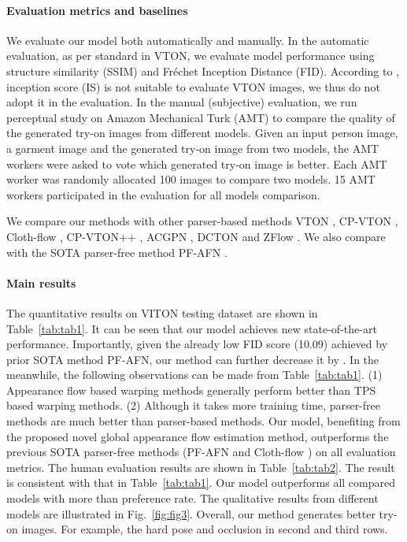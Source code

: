 \documentclass[10pt,twocolumn,letterpaper]{article}
\begin{document}
\paragraph{Evaluation metrics and baselines} We evaluate our model both automatically and manually. In the automatic evaluation, as per standard in VTON, we evaluate model performance using structure similarity (SSIM) \cite{wang2004image} and Fr\'{e}chet Inception Distance (FID)\cite{heusel2017gans}. According to \cite{rosca2017variational,ge2021parser}, inception score (IS) \cite{salimans2016improved} is not suitable to evaluate VTON images, we thus do not adopt it in the evaluation. In the manual (subjective) evaluation, we run perceptual study on
Amazon Mechanical Turk (AMT) to compare the quality
of the generated try-on images from different models. Given an  input person image, a garment image and the generated try-on image from two models, the AMT workers were asked to vote which generated try-on image is better. Each AMT worker was randomly allocated 100 images to compare two models. 15 AMT workers participated in the evaluation for all models comparison.

We compare our methods with other parser-based methods VTON \cite{han2018viton}, CP-VTON \cite{wang2018toward}, Cloth-flow \cite{han2019clothflow}, CP-VTON++ \cite{minar2020cp}, ACGPN \cite{yang2020towards}, DCTON \cite{ge2021disentangled} and ZFlow \cite{chopra2021zflow}. We also compare with the SOTA parser-free method PF-AFN \cite{ge2021parser}. 
\vspace{-0.4cm}
\paragraph{Main results} The quantitative results on VITON testing dataset are  shown in Table~\ref{tab:tab1}. It can be seen that our model achieves new state-of-the-art performance. Importantly, given the already low FID score (10.09) achieved by prior SOTA method PF-AFN,  our method can further decrease it by . In the meanwhile, the following observations can be made from  Table~\ref{tab:tab1}. (1) Appearance flow based warping methods generally perform better than TPS based warping methods. (2) Although it takes more training time, parser-free methods are much better than parser-based methods. Our model, benefiting from the proposed novel global appearance flow estimation method, outperforms the previous SOTA parser-free methods (PF-AFN \cite{ge2021parser} and Cloth-flow \cite{han2019clothflow}) on all evaluation metrics.  
The human evaluation results are shown in Table~\ref{tab:tab2}. The result is consistent with that in Table~\ref{tab:tab1}. Our model outperforms all compared models with more than  preference rate. The qualitative results from different models are illustrated in Fig.~\ref{fig:fig3}. Overall, our method generates better try-on images. For example, the hard pose and occlusion in second and third rows. 
\end{document}
